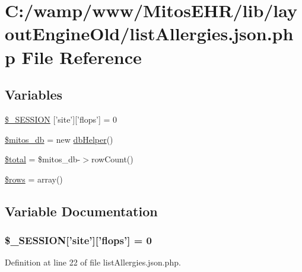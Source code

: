 \hypertarget{list_allergies_8json_8php}{\section{\-C\-:/wamp/www/\-Mitos\-E\-H\-R/lib/layout\-Engine\-Old/list\-Allergies.json.\-php \-File \-Reference}
\label{list_allergies_8json_8php}
}
\subsection*{\-Variables}
\begin{DoxyCompactItemize}
\item 
\hyperlink{list_allergies_8json_8php_a99fda8552a3e58235643b79f5af3ded8}{\$\-\_\-\-S\-E\-S\-S\-I\-O\-N} \mbox{[}'site'\mbox{]}\mbox{[}'flops'\mbox{]} = 0
\item 
\hyperlink{list_allergies_8json_8php_ab5d961f93efe4e2e8d8374f01dd6c65a}{\$mitos\-\_\-db} = new \hyperlink{classdb_helper}{db\-Helper}()
\item 
\hyperlink{list_allergies_8json_8php_a241b818f48030b628685b2e5119c5624}{\$total} = \$mitos\-\_\-db-\/$>$row\-Count()
\item 
\hyperlink{list_allergies_8json_8php_ace2ec39e7df3899fa8df9640ec274b03}{\$rows} = array()
\end{DoxyCompactItemize}


\subsection{\-Variable \-Documentation}
\hypertarget{list_allergies_8json_8php_a99fda8552a3e58235643b79f5af3ded8}{
\subsubsection[{\$\-\_\-\-S\-E\-S\-S\-I\-O\-N}]{\setlength{\rightskip}{0pt plus 5cm}\$\-\_\-\-S\-E\-S\-S\-I\-O\-N\mbox{[}'site'\mbox{]}\mbox{[}'flops'\mbox{]} = 0}}\label{list_allergies_8json_8php_a99fda8552a3e58235643b79f5af3ded8}


\-Definition at line 22 of file list\-Allergies.\-json.\-php.

